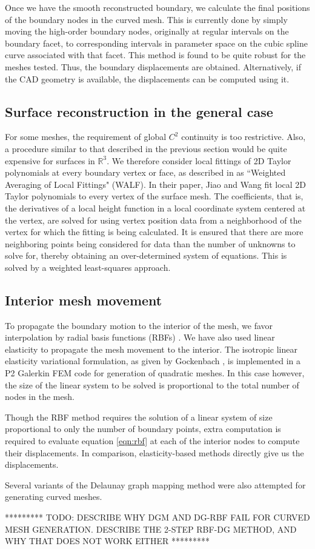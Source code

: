 Once we have the smooth reconstructed boundary, we calculate the final positions of the boundary nodes in the curved mesh. This is currently done by simply moving the high-order boundary nodes, originally at regular intervals on the boundary facet, to corresponding intervals in parameter space on the cubic spline curve associated with that facet. This method is found to be quite robust for the meshes tested. Thus, the boundary displacements are obtained. Alternatively, if the CAD geometry is available, the displacements can be computed using it.

\subsection{Surface reconstruction in the general case}
For some meshes, the requirement of global $C^2$ continuity is too restrictive. Also, a procedure similar to that described in the previous section would be quite expensive for surfaces in $\mathbb{R}^3$. We therefore consider local fittings of 2D Taylor polynomials at every boundary vertex or face, as described in \cite{sr:jiaowang} as ``Weighted Averaging of Local Fittings" (WALF). In their paper, Jiao and Wang fit local 2D Taylor polynomials to every vertex of the surface mesh. The coefficients, that is, the derivatives of a local height function in a local coordinate system centered at the vertex, are solved for using vertex position data from a neighborhood of the vertex for which the fitting is being calculated. It is ensured that there are more neighboring points being considered for data than the number of unknowns to solve for, thereby obtaining an over-determined system of equations. This is solved by a weighted least-squares approach.

\subsection{Interior mesh movement}

To propagate the boundary motion to the interior of the mesh, we favor interpolation by radial basis functions (RBFs) \cite{mm:rbf}. We have also used linear elasticity to propagate the mesh movement to the interior. The isotropic linear elasticity variational formulation, as given by Gockenbach \cite{gockenbach}, is implemented in a P2 Galerkin FEM code for generation of quadratic meshes. In this case however, the size of the linear system to be solved is proportional to the total number of nodes in the mesh.

Though the RBF method requires the solution of a linear system of size proportional to only the number of boundary points, extra computation is required to evaluate equation \eqref{eqn:rbf} at each of the interior nodes to compute their displacements. In comparison, elasticity-based methods directly give us the displacements.

Several variants of the Delaunay graph mapping method were also attempted for generating curved meshes.

********* TODO: DESCRIBE WHY DGM AND DG-RBF FAIL FOR CURVED MESH GENERATION. DESCRIBE THE 2-STEP RBF-DG METHOD, AND WHY THAT DOES NOT WORK EITHER *********


